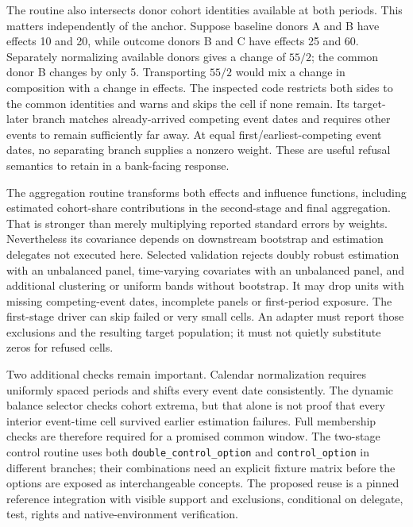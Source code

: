 The routine also intersects donor cohort identities available at both periods. This matters independently of the anchor.
Suppose baseline donors A and B have effects 10 and 20, while outcome donors B and C have effects 25 and 60. Separately
normalizing available donors gives a change of $55/2$; the common donor B changes by only 5. Transporting $55/2$ would
mix a change in composition with a change in effects. The inspected code restricts both sides to the common identities
and warns and skips the cell if none remain. Its target-later branch matches already-arrived competing event dates and
requires other events to remain sufficiently far away. At equal first/earliest-competing event dates, no separating branch
supplies a nonzero weight. These are useful refusal semantics to retain in a bank-facing response.~\citep{exec28_panel_delegates,exec28_panel_delegate_reference}

The aggregation routine transforms both effects and influence functions, including estimated cohort-share contributions
in the second-stage and final aggregation. That is stronger than merely multiplying reported standard errors by weights.
Nevertheless its covariance depends on downstream bootstrap and estimation delegates not executed here. Selected validation
rejects doubly robust estimation with an unbalanced panel, time-varying covariates with an unbalanced panel, and additional
clustering or uniform bands without bootstrap. It may drop units with missing competing-event dates, incomplete panels or
first-period exposure. The first-stage driver can skip failed or very small cells. An adapter must report those exclusions
and the resulting target population; it must not quietly substitute zeros for refused cells.~\citep{exec28_panel_delegates}

Two additional checks remain important. Calendar normalization requires uniformly spaced periods and shifts every event
date consistently. The dynamic balance selector checks cohort extrema, but that alone is not proof that every interior
event-time cell survived earlier estimation failures. Full membership checks are therefore required for a promised common
window. The two-stage control routine uses both \texttt{double\_control\_option} and \texttt{control\_option} in different
branches; their combinations need an explicit fixture matrix before the options are exposed as interchangeable concepts.
The proposed reuse is a pinned reference integration with visible support and exclusions, conditional on delegate, test,
rights and native-environment verification.~\citep{exec28_panel_delegates}

